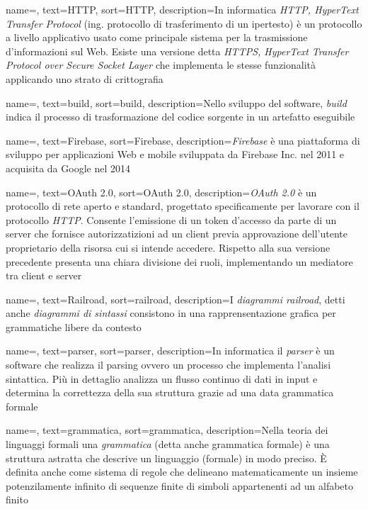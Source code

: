 {
	name=,
	text=HTTP,
	sort=HTTP,
	description={In informatica \emph{HTTP, HyperText Transfer Protocol} (ing. protocollo di trasferimento di un ipertesto) è un protocollo a livello applicativo usato come principale sistema per la trasmissione d'informazioni sul Web. Esiste una versione detta \emph{HTTPS, HyperText Transfer Protocol over Secure Socket Layer} che implementa le stesse funzionalità applicando uno strato di crittografia}
}

{
	name=,
	text=build,
	sort=build,
	description={Nello sviluppo del software, \emph{build} indica il processo di trasformazione del codice sorgente in un artefatto eseguibile}
}

{
	name=,
	text=Firebase,
	sort=Firebase,
	description={\emph{Firebase} è una piattaforma di sviluppo per applicazioni Web e mobile sviluppata da Firebase Inc. nel 2011 e acquisita da Google nel 2014}
}

{
	name=,
	text=OAuth 2.0,
	sort=OAuth 2.0,
	description={\emph{OAuth 2.0} è un protocollo di rete aperto e standard, progettato specificamente per lavorare con il protocollo \emph{HTTP}. Consente l'emissione di un token d'accesso da parte di un server che fornisce autorizzatizioni ad un client previa approvazione dell'utente proprietario della risorsa cui si intende accedere. Rispetto alla sua versione precedente presenta una chiara divisione dei ruoli, implementando un mediatore tra client e server}
}

{
	name=,
	text=Railroad,
	sort=railroad,
	description={I \emph{diagrammi railroad}, detti anche \emph{diagrammi di sintassi} consistono in una rapprensentazione grafica per grammatiche libere da contesto}
}

{
	name=,
	text=parser,
	sort=parser,
	description={In informatica il \emph{parser} è un software che realizza il parsing ovvero un processo che implementa l'analisi sintattica. Più in dettaglio analizza un flusso continuo di dati in input e determina la correttezza della sua struttura grazie ad una data grammatica formale}
}

{
	name=,
	text=grammatica,
	sort=grammatica,
	description={Nella teoria dei linguaggi formali una \emph{grammatica} (detta anche grammatica formale) è una struttura astratta che descrive un linguaggio (formale) in modo preciso. È definita anche come sistema di regole che delineano matematicamente un insieme potenzilamente infinito di sequenze finite di simboli appartenenti ad un alfabeto finito}
}

